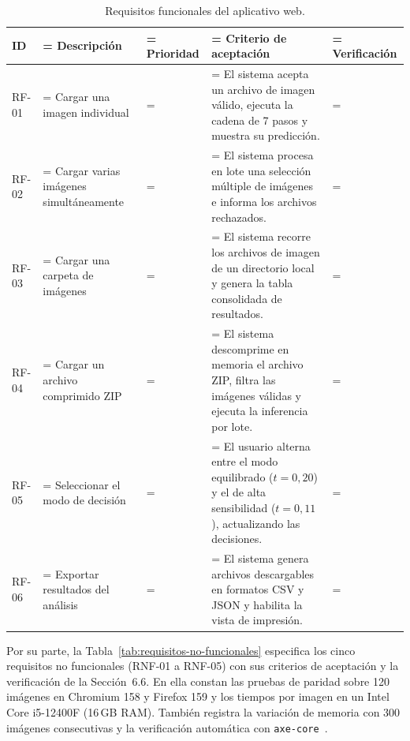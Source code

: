 \begin{table}[H]
  \centering
  \caption{Requisitos funcionales del aplicativo web.}
  \label{tab:requisitos-funcionales}
  \footnotesize
  \begin{tabularx}{\textwidth}{l >{\hsize\linewidth=\hsize}Y >{\hsize\linewidth=\hsize}Y >{\hsize\linewidth=\hsize}Y >{\hsize\linewidth=\hsize}Y}
    \toprule
    ID & Descripción & Prioridad & Criterio de aceptación & Verificación \\
    \midrule
    RF-01 & Cargar una imagen individual &  & El sistema acepta un archivo de imagen válido, ejecuta la cadena de 7 pasos y muestra su predicción. & \pendiente{} \\
    RF-02 & Cargar varias imágenes simultáneamente &  & El sistema procesa en lote una selección múltiple de imágenes e informa los archivos rechazados. & \pendiente{} \\
    RF-03 & Cargar una carpeta de imágenes &  & El sistema recorre los archivos de imagen de un directorio local y genera la tabla consolidada de resultados. & \pendiente{} \\
    RF-04 & Cargar un archivo comprimido ZIP &  & El sistema descomprime en memoria el archivo ZIP, filtra las imágenes válidas y ejecuta la inferencia por lote. & \pendiente{} \\
    RF-05 & Seleccionar el modo de decisión &  & El usuario alterna entre el modo equilibrado ($t = 0{,}20$) y el de alta sensibilidad ($t = 0{,}11$), actualizando las decisiones. & \pendiente{} \\
    RF-06 & Exportar resultados del análisis &  & El sistema genera archivos descargables en formatos CSV y JSON y habilita la vista de impresión. & \pendiente{} \\
    \bottomrule
  \end{tabularx}
\end{table}

Por su parte, la Tabla~\ref{tab:requisitos-no-funcionales} especifica los cinco requisitos no funcionales (RNF-01 a RNF-05) con sus criterios de aceptación y la verificación de la Sección~6.6. En ella constan las pruebas de paridad sobre 120 imágenes en Chromium 158 y Firefox 159 y los tiempos por imagen en un Intel Core i5-12400F (16\,GB RAM). También registra la variación de memoria con 300 imágenes consecutivas y la verificación automática con \texttt{axe-core}~\cite{w3c2023wcag22}.


